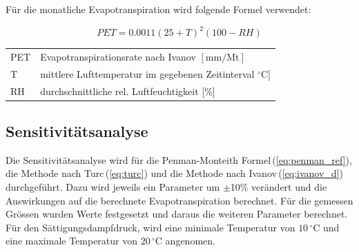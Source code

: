 Für die monatliche Evapotranspiration wird folgende Formel verwendet:

\begin{equation}
\label{eq:ivanov_m}
PET=0.0011(25+T)^2(100-RH)
\end{equation}
\begin{table}[H]
\centering
\begin{tabular}{ll}
PET & Evapotranspirationsrate nach Ivanov  $\mathrm{[mm/Mt]}$\\
T & mittlere Lufttemperatur im gegebenen Zeitinterval $\mathrm{{^\circ}C]}$\\
RH& durchschnittliche rel. Luftfeuchtigkeit [\%]\\
\end{tabular}
\end{table}

\subsection{Sensitivitätsanalyse}

Die Sensitivitätsanalyse wird für die Penman-Monteith Formel\,(\ref{eq:penman_ref}), die Methode nach Turc\,(\ref{eq:turc}) und die Methode nach Ivanov\,(\ref{eq:ivanov_d}) durchgeführt. Dazu wird jeweils ein Parameter um $\pm$10\% verändert und die Auswirkungen auf die berechnete Evapotranspiration berechnet. Für die gemessen Grössen wurden Werte festgesetzt und daraus die weiteren Parameter berechnet. Für den Sättigungsdampfdruck, wird eine minimale Temperatur von $\mathrm{10\,^{\circ}C}$ und eine maximale Temperatur von $\mathrm{20\,^{\circ}C}$ angenomen.




